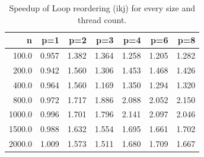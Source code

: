 \begin{table}[ht]
\centering
\small
\begin{tabular}{rrrrrrr}
\hline
n & p=1 & p=2 & p=3 & p=4 & p=6 & p=8 \\
\hline
100.0 & 0.957 & 1.382 & 1.364 & 1.258 & 1.205 & 1.282 \\
200.0 & 0.942 & 1.560 & 1.306 & 1.453 & 1.468 & 1.426 \\
400.0 & 0.964 & 1.560 & 1.169 & 1.350 & 1.294 & 1.320 \\
800.0 & 0.972 & 1.717 & 1.886 & 2.088 & 2.052 & 2.150 \\
1000.0 & 0.996 & 1.701 & 1.796 & 2.141 & 2.097 & 2.046 \\
1500.0 & 0.988 & 1.632 & 1.554 & 1.695 & 1.661 & 1.702 \\
2000.0 & 1.009 & 1.573 & 1.511 & 1.680 & 1.709 & 1.667 \\
\hline
\end{tabular}
\caption{Speedup of Loop reordering (ikj) for every size and thread count.}
\label{tab:speedup_all_sizes_ikj}
\end{table}
